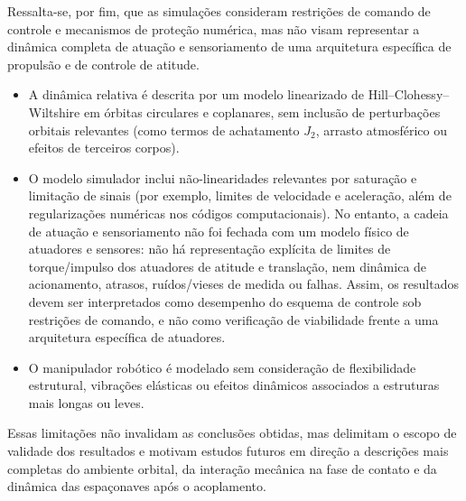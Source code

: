 Ressalta-se, por fim, que as simulações consideram restrições de comando de controle e mecanismos de proteção numérica, mas não visam representar a dinâmica completa de atuação e sensoriamento de uma arquitetura específica de propulsão e de controle de atitude.

\begin{itemize}
    \item A dinâmica relativa é descrita por um modelo linearizado de Hill--Clohessy--Wiltshire em órbitas circulares e coplanares, sem inclusão de perturbações orbitais relevantes (como termos de achatamento $J_2$, arrasto atmosférico ou efeitos de terceiros corpos).

    \item O modelo simulador inclui não-linearidades relevantes por saturação e limitação de sinais (por exemplo, limites de velocidade e aceleração, além de regularizações numéricas nos códigos computacionais).
    No entanto, a cadeia de atuação e sensoriamento não foi fechada com um modelo físico de atuadores e sensores: não há representação explícita de limites de torque/impulso dos atuadores de atitude e translação, nem dinâmica de acionamento, atrasos, ruídos/vieses de medida ou falhas.
    Assim, os resultados devem ser interpretados como desempenho do esquema de controle sob restrições de comando, e não como verificação de viabilidade frente a uma arquitetura específica de atuadores.

    \item O manipulador robótico é modelado sem consideração de flexibilidade estrutural, vibrações elásticas ou efeitos dinâmicos associados a estruturas mais longas ou leves.
\end{itemize}

Essas limitações não invalidam as conclusões obtidas, mas delimitam o escopo de validade dos resultados e motivam estudos futuros em direção a descrições mais completas do ambiente orbital, da interação mecânica na fase de contato e da dinâmica das espaçonaves após o acoplamento.
